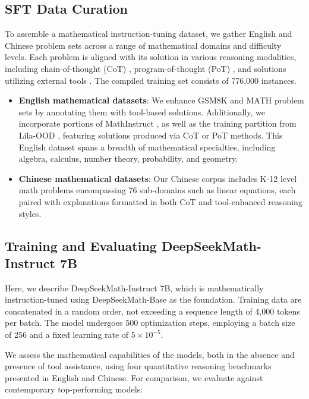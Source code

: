 \begin{itemize}[topsep=0pt]
\subsection{SFT Data Curation}

To assemble a mathematical instruction-tuning dataset, we gather English and Chinese problem sets across a range of mathematical domains and difficulty levels. Each problem is aligned with its solution in various reasoning modalities, including chain-of-thought (CoT) \citep{cot}, program-of-thought (PoT) \citep{pot,pal}, and solutions utilizing external tools \citep{tora}. The compiled training set consists of 776,000 instances.

\begin{itemize}[topsep=0pt]
    \item \textbf{English mathematical datasets}: We enhance GSM8K and MATH problem sets by annotating them with tool-based solutions. Additionally, we incorporate portions of MathInstruct \citep{MathInstruct}, as well as the training partition from Lila-OOD \citep{lila}, featuring solutions produced via CoT or PoT methods. This English dataset spans a breadth of mathematical specialties, including algebra, calculus, number theory, probability, and geometry.
    \item \textbf{Chinese mathematical datasets}: Our Chinese corpus includes K-12 level math problems encompassing 76 sub-domains such as linear equations, each paired with explanations formatted in both CoT and tool-enhanced reasoning styles.
\end{itemize}

\subsection{Training and Evaluating DeepSeekMath-Instruct 7B}

Here, we describe DeepSeekMath-Instruct 7B, which is mathematically instruction-tuned using DeepSeekMath-Base as the foundation. Training data are concatenated in a random order, not exceeding a sequence length of 4,000 tokens per batch. The model undergoes 500 optimization steps, employing a batch size of 256 and a fixed learning rate of $5\times10^{-5}$.

We assess the mathematical capabilities of the models, both in the absence and presence of tool assistance, using four quantitative reasoning benchmarks presented in English and Chinese. For comparison, we evaluate against contemporary top-performing models:


\end{itemize}
